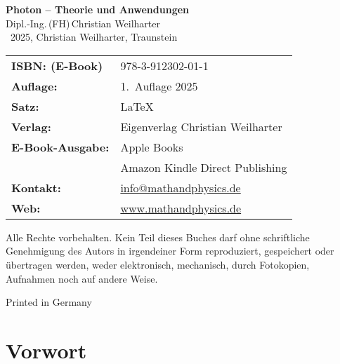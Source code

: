 \cleardoublepage
\thispagestyle{empty}
\begin{center}


{\Large\textbf{Photon – Theorie und Anwendungen}}\\[1.2em]
{\large Dipl.-Ing.\,(FH)\,Christian Weilharter}\\[1.2em]
\textcopyright~2025, Christian Weilharter, Traunstein\\[2em]
\end{center}
\begin{flushleft}
	\begin{tabular}{@{}l l}
	
	
	
		\textbf{ISBN: (E-Book)} & 978-3-912302-01-1 \\[0.5em]
		\textbf{Auflage:} & 1.~Auflage 2025 \\[0.5em]
		\textbf{Satz:} & \LaTeX \\[0.5em]
		\textbf{Verlag:} & Eigenverlag Christian Weilharter\\[0.5em]
		\textbf{E-Book-Ausgabe:} & Apple Books\\[0.5em]
		&Amazon Kindle Direct Publishing \\[0.5em]
	
	
		
		\textbf{Kontakt:}& \href{mailto:info@mathandphysiks.de} {info@mathandphysics.de}\\[0.5em]
		\textbf{Web:} &\href{ www.mathandphysiks.de}{www.mathandphysics.de}\\

	\end{tabular}
\end{flushleft}

\vspace{2em}
\noindent
Alle Rechte vorbehalten. Kein Teil dieses Buches darf ohne schriftliche Genehmigung des Autors 
in irgendeiner Form reproduziert, gespeichert oder übertragen werden, 
weder elektronisch, mechanisch, durch Fotokopien, Aufnahmen noch auf andere Weise.
\begin{center}\small Printed in Germany\end{center}

\cleardoublepage

\chapter*{Vorwort}



